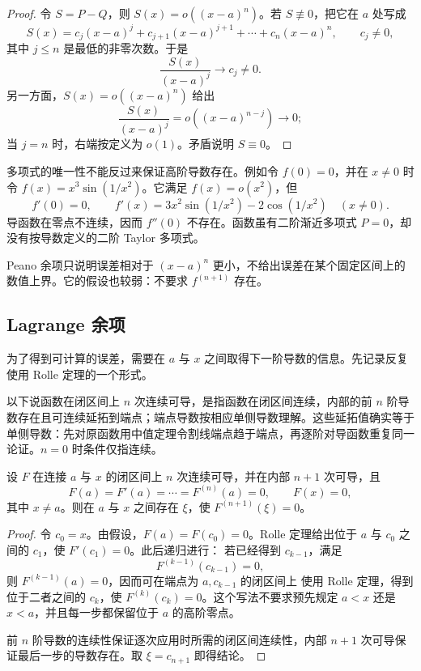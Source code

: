 \begin{proof}
令 \(S=P-Q\)，则 \(S(x)=o((x-a)^n)\)。若 \(S\not\equiv0\)，把它在 \(a\) 处写成
\[
 S(x)=c_j(x-a)^j+c_{j+1}(x-a)^{j+1}+\cdots+c_n(x-a)^n,
 \qquad c_j\ne0,
\]
其中 \(j\le n\) 是最低的非零次数。于是
\[
 \frac{S(x)}{(x-a)^j}\longrightarrow c_j\ne0.
\]
另一方面，\(S(x)=o((x-a)^n)\) 给出
\[
 \frac{S(x)}{(x-a)^j}=o((x-a)^{n-j})\longrightarrow0;
\]
当 \(j=n\) 时，右端按定义为 \(o(1)\)。矛盾说明 \(S\equiv0\)。
\end{proof}

多项式的唯一性不能反过来保证高阶导数存在。例如令 \(f(0)=0\)，并在 \(x\ne0\) 时令 \(f(x)=x^3\sin(1/x^2)\)。它满足 \(f(x)=o(x^2)\)，但
\[
 f'(0)=0,\qquad f'(x)=3x^2\sin(1/x^2)-2\cos(1/x^2)\quad(x\ne0).
\]
导函数在零点不连续，因而 \(f''(0)\) 不存在。函数虽有二阶渐近多项式 \(P=0\)，却没有按导数定义的二阶 Taylor 多项式。

Peano 余项只说明误差相对于 \((x-a)^n\) 更小，不给出误差在某个固定区间上的数值上界。它的假设也较弱：不要求 \(f^{(n+1)}\) 存在。

\subsection{Lagrange 余项}

为了得到可计算的误差，需要在 \(a\) 与 \(x\) 之间取得下一阶导数的信息。先记录反复使用 Rolle 定理的一个形式。

以下说函数在闭区间上 \(n\) 次连续可导，是指函数在闭区间连续，内部的前 \(n\) 阶导数存在且可连续延拓到端点；端点导数按相应单侧导数理解。这些延拓值确实等于单侧导数：先对原函数用中值定理令割线端点趋于端点，再逐阶对导函数重复同一论证。\(n=0\) 时条件仅指连续。

\begin{lemma}
设 \(F\) 在连接 \(a\) 与 \(x\) 的闭区间上 \(n\) 次连续可导，并在内部 \(n+1\) 次可导，且
\[
 F(a)=F'(a)=\cdots=F^{(n)}(a)=0,
 \qquad F(x)=0,
\]
其中 \(x\ne a\)。则在 \(a\) 与 \(x\) 之间存在 \(\xi\)，使 \(F^{(n+1)}(\xi)=0\)。
\end{lemma}

\begin{proof}
令 \(c_0=x\)。由假设，\(F(a)=F(c_0)=0\)。Rolle 定理给出位于
\(a\) 与 \(c_0\) 之间的 \(c_1\)，使 \(F'(c_1)=0\)。此后递归进行：
若已经得到 \(c_{k-1}\)，满足
\[
 F^{(k-1)}(c_{k-1})=0,
\]
则 \(F^{(k-1)}(a)=0\)，因而可在端点为 \(a,c_{k-1}\) 的闭区间上
使用 Rolle 定理，得到位于二者之间的 \(c_k\)，使
\(F^{(k)}(c_k)=0\)。这个写法不要求预先规定 \(a<x\) 还是
\(x<a\)，并且每一步都保留位于 \(a\) 的高阶零点。

前 \(n\) 阶导数的连续性保证逐次应用时所需的闭区间连续性，内部
\(n+1\) 次可导保证最后一步的导数存在。取
\(\xi=c_{n+1}\) 即得结论。
\end{proof}

